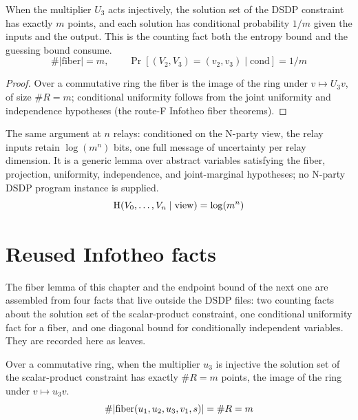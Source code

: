 \begin{lemma}
  \label{lem:dsdp_fiber_uniform}
  \rocqok
  When the multiplier $U_3$ acts injectively, the solution set of the DSDP
  constraint has exactly $m$ points, and each solution has conditional probability
  $1/m$ given the inputs and the output. This is the counting fact both the
  entropy bound and the guessing bound consume.
  \[ \#\lvert\mathrm{fiber}\rvert = m,\qquad
        \Pr[(V_2,V_3)=(v_2,v_3)\mid \mathrm{cond}] = 1/m \]
\end{lemma}
\begin{proof}
  \rocqok
  Over a commutative ring the fiber is the image of the ring under $v \mapsto U_3
  v$, of size $\#R = m$; conditional uniformity follows from the joint uniformity
  and independence hypotheses (the route-F Infotheo fiber theorems).
\end{proof}

\begin{theorem}
  \label{thm:dsdp_centropy_uniform_n}
  \rocqok
  The same argument at $n$ relays: conditioned on the N-party view, the relay
  inputs retain $\log(m^n)$ bits, one full message of uncertainty per relay
  dimension. It is a generic lemma over abstract variables satisfying the fiber,
  projection, uniformity, independence, and joint-marginal hypotheses; no N-party
  DSDP program instance is supplied.
  \[ \mathrm{H}(V_0,\dots,V_{n} \mid \mathrm{view}) = \log(m^{n}) \]
\end{theorem}

\section{Reused Infotheo facts}

The fiber lemma of this chapter and the endpoint bound of the next one are
assembled from four facts that live outside the DSDP files: two counting facts
about the solution set of the scalar-product constraint, one conditional
uniformity fact for a fiber, and one diagonal bound for conditionally independent
variables. They are recorded here as leaves.

\begin{lemma}
  \label{lem:exist_fiber_card}
  \rocqok
  Over a commutative ring, when the multiplier $u_3$ is injective the solution
  set of the scalar-product constraint has exactly $\#R = m$ points, the image of
  the ring under $v \mapsto u_3 v$.
  \[ \#\lvert \mathrm{fiber}(u_1,u_2,u_3,v_1,s)\rvert = \#R = m \]
\end{lemma}

